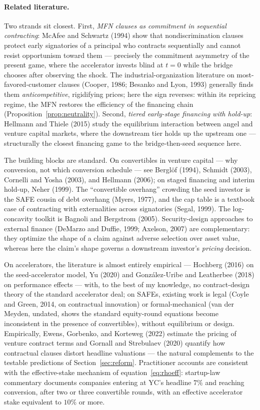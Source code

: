 \documentclass[11pt]{article}
\theoremstyle{definition}
\begin{document}
\paragraph{Related literature.}
Two strands sit closest. First, \emph{MFN clauses as commitment in sequential contracting}: McAfee and Schwartz (1994) show that nondiscrimination clauses protect early signatories of a principal who contracts sequentially and cannot resist opportunism toward them --- precisely the commitment asymmetry of the present game, where the accelerator invests blind at $t=0$ while the bridge chooses after observing the shock. The industrial-organization literature on most-favored-customer clauses (Cooper, 1986; Besanko and Lyon, 1993) generally finds them \emph{anticompetitive}, rigidifying prices; here the sign reverses: within its repricing regime, the MFN restores the efficiency of the financing chain (Proposition~\ref{prop:neutrality}). Second, \emph{tiered early-stage financing with hold-up}: Hellmann and Thiele (2015) study the equilibrium interaction between angel and venture capital markets, where the downstream tier holds up the upstream one --- structurally the closest financing game to the bridge-then-seed sequence here.

The building blocks are standard. On convertibles in venture capital --- why conversion, not which conversion schedule --- see Berglöf (1994), Schmidt (2003), Cornelli and Yosha (2003), and Hellmann (2006); on staged financing and interim hold-up, Neher (1999). The ``convertible overhang'' crowding the seed investor is the SAFE cousin of debt overhang (Myers, 1977), and the cap table is a textbook case of contracting with externalities across signatories (Segal, 1999). The log-concavity toolkit is Bagnoli and Bergstrom (2005). Security-design approaches to external finance (DeMarzo and Duffie, 1999; Axelson, 2007) are complementary: they optimize the shape of a claim against adverse selection over asset value, whereas here the claim's shape governs a downstream investor's \emph{pricing} decision.

On accelerators, the literature is almost entirely empirical --- Hochberg (2016) on the seed-accelerator model, Yu (2020) and Gonz\'alez-Uribe and Leatherbee (2018) on performance effects --- with, to the best of my knowledge, no contract-design theory of the standard accelerator deal; on SAFEs, existing work is legal (Coyle and Green, 2014, on contractual innovation) or formal-mechanical (van der Meyden, undated, shows the standard equity-round equations become inconsistent in the presence of convertibles), without equilibrium or design. Empirically, Ewens, Gorbenko, and Korteweg (2022) estimate the pricing of venture contract terms and Gornall and Strebulaev (2020) quantify how contractual clauses distort headline valuations --- the natural complements to the testable predictions of Section~\ref{sec:reform}. Practitioner accounts are consistent with the effective-stake mechanism of equation~\eqref{eq:rhoeff}: startup-law commentary documents companies entering at YC's headline $7\%$ and reaching conversion, after two or three convertible rounds, with an effective accelerator stake equivalent to $10\%$ or more.
\end{document}
